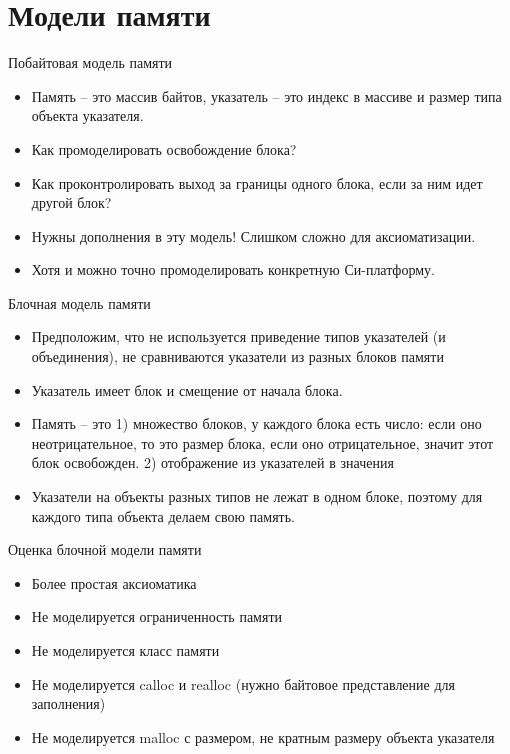 \documentclass[hyperref={unicode=true}]{beamer}
\begin{document}
    \section{Модели памяти}

\iffalse
    \begin{frame}{Побайтовая модель памяти}
    \begin{itemize}
    \item Память -- это массив байтов, указатель --
    это индекс в массиве и размер типа объекта указателя.
    \item Как промоделировать освобождение блока?
    \item
    Как проконтролировать выход за границы одного блока,
    если за ним идет другой блок?
    \item Нужны дополнения
    в эту модель! Слишком сложно для аксиоматизации.
    \item Хотя и можно точно промоделировать конкретную
    Си-платформу.
    \end{itemize}
    \end{frame}

    \begin{frame}{Блочная модель памяти}
    \begin{itemize}
    \item Предположим, что не используется приведение
    типов указателей (и объединения), не сравниваются
    указатели из разных блоков памяти
    \item
    Указатель имеет блок и смещение от начала блока.
    \item
    Память -- это 1) множество блоков, у каждого блока есть
    число: если оно неотрицательное, то это размер блока,
    если оно отрицательное, значит этот блок освобожден.
    2) отображение из указателей в значения
    \item
    Указатели на объекты разных типов не лежат в одном блоке,
    поэтому для каждого типа объекта делаем свою память.
    \end{itemize}
    \end{frame}

    \begin{frame}{Оценка блочной модели памяти}
    \begin{itemize}
    \item Более простая аксиоматика
    \item Не моделируется ограниченность памяти
    \item Не моделируется класс памяти
    \item Не моделируется calloc и realloc
    (нужно байтовое представление для заполнения)
    \item Не моделируется malloc с
    размером, не кратным размеру объекта указателя
    \end{itemize}
    \end{frame}
\end{document}
